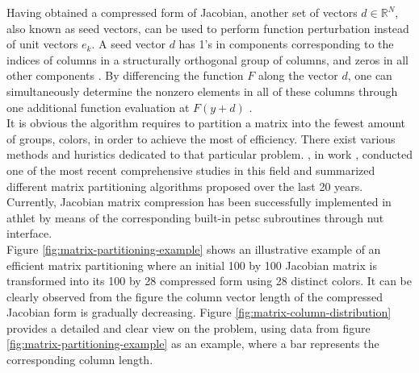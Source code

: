 

Having obtained a compressed form of Jacobian, another set of vectors $d \in \mathbb{R}^{N}$, also known as seed vectors, can be used to perform function perturbation instead of unit vectors $e_{k}$. A seed vector $d$ has 1’s in components corresponding to the indices of columns in a structurally orthogonal group of columns, and zeros in all other components \cite{gebremedhin2005color}. By differencing the function $F$ along the vector $d$, one can simultaneously determine the nonzero elements in all of these columns through one additional function evaluation at $F(y+d)$ \cite{gebremedhin2005color}.\\


It is obvious the algorithm requires to partition a matrix into the fewest amount of groups, colors, in order to achieve the most of efficiency. There exist various methods and huristics dedicated to that particular problem. \citeauthor{gebremedhin2005color}, in work \cite{gebremedhin2005color}, conducted one of the most recent comprehensive studies in this field and summarized different matrix partitioning algorithms proposed over the last 20 years. Currently, Jacobian matrix compression has been successfully implemented in \acrshort{athlet} by means of the corresponding built-in \acrshort{petsc} subroutines through \acrshort{nut} interface.\\


Figure \ref{fig:matrix-partitioning-example} shows an illustrative example of an efficient matrix partitioning where an initial 100 by 100 Jacobian matrix is transformed into its 100 by 28 compressed form using 28 distinct colors. It can be clearly observed from the figure the column vector length of the compressed Jacobian form is gradually decreasing. Figure \ref{fig:matrix-column-distribution} provides a detailed and clear view on the problem, using data from figure \ref{fig:matrix-partitioning-example} as an example, where a bar represents the corresponding column length.\\


